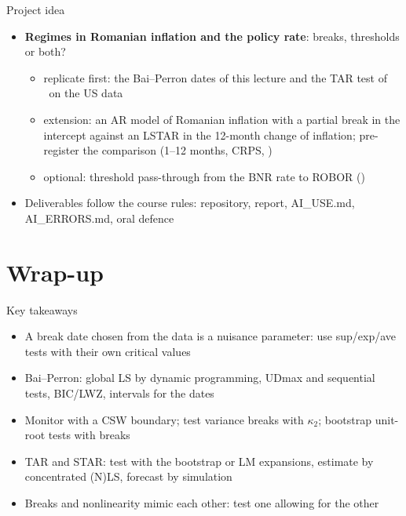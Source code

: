\begin{frame}{Project idea}
\itemsize{\small}
\begin{itemize}
    \item \textbf{Regimes in Romanian inflation and the policy rate}: breaks, thresholds or both?
    \begin{itemize}
        \item replicate first: the Bai--Perron dates of this lecture and the TAR test of \ on the US data
        \item extension: an AR model of Romanian inflation with a partial break in the intercept against an LSTAR in the 12-month change of inflation; pre-register the comparison (1--12 months, CRPS, )
        \item optional: threshold pass-through from the BNR rate to ROBOR ()
    \end{itemize}
    \item Deliverables follow the course rules: repository, report, AI\_USE.md, AI\_ERRORS.md, oral defence
\end{itemize}
\end{frame}


\section{Wrap-up}

\begin{frame}{Key takeaways}
\itemsize{\small}
\begin{itemize}
    \item A break date chosen from the data is a nuisance parameter: use sup/exp/ave tests with their own critical values
    \item Bai--Perron: global LS by dynamic programming, UDmax and sequential tests, BIC/LWZ, intervals for the dates
    \item Monitor with a CSW boundary; test variance breaks with $\kappa_2$; bootstrap unit-root tests with breaks
    \item TAR and STAR: test with the bootstrap or LM expansions, estimate by concentrated (N)LS, forecast by simulation
    \item Breaks and nonlinearity mimic each other: test one allowing for the other
\end{itemize}
\end{frame}

